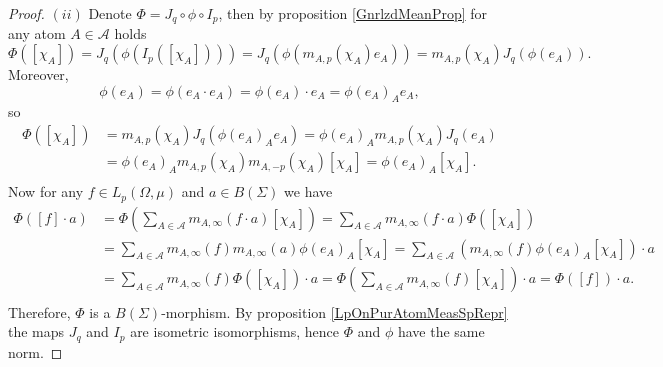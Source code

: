 \documentclass[12pt]{article}
\begin{document}
\begin{proof}
    $(ii)$ Denote $\Phi=J_q\circ \phi\circ I_p$, then by 
    proposition \ref{GnrlzdMeanProp} for any atom $A\in\mathcal{A}$ holds
    \[
        \Phi([\chi_A])
        =J_q(\phi(I_p([\chi_A])))
        =J_q(\phi(m_{A,p}(\chi_A)e_A))
        =m_{A,p}(\chi_A)J_q(\phi(e_A)).
    \]
    Moreover,
    \[
        \phi(e_A)
        =\phi(e_A\cdot e_A)
        =\phi(e_A)\cdot e_A
        =\phi(e_A)_A e_A,
    \]
    so
    \[
    \begin{aligned}
        \Phi([\chi_A])
        &=m_{A,p}(\chi_A)J_q(\phi(e_A)_A e_A) 
        =\phi(e_A)_A m_{A,p}(\chi_A)J_q( e_A) \\
        &=\phi(e_A)_A m_{A,p}(\chi_A)m_{A,-p}(\chi_A) [\chi_A] 
        =\phi(e_A)_A [\chi_A]. \\
    \end{aligned}
    \]
    Now for any $f\in L_p(\Omega, \mu)$ and $a\in B(\Sigma)$ we have
    \[
    \begin{aligned}
        \Phi([f]\cdot a)
        &=\Phi\left(
            \sum_{A\in\mathcal{A}} m_{A,\infty}(f\cdot a)[\chi_A]
        \right) 
        =\sum_{A\in\mathcal{A}} m_{A,\infty}(f\cdot a) \Phi([\chi_A]) \\
        &=\sum_{A\in\mathcal{A}} 
            m_{A,\infty}(f) m_{A,\infty}(a) \phi(e_A)_A [\chi_A] 
        =\sum_{A\in\mathcal{A}} 
            (m_{A,\infty}(f) \phi(e_A)_A [\chi_A])\cdot a \\
        &=\sum_{A\in\mathcal{A}} 
            m_{A,\infty}(f) \Phi([\chi_A])\cdot a 
        =\Phi\left(\sum_{A\in\mathcal{A}} 
            m_{A,\infty}(f) [\chi_A]\right)\cdot a 
        =\Phi([f])\cdot a. \\
    \end{aligned}
    \]
    Therefore, $\Phi$ is a $B(\Sigma)$-morphism. By 
    proposition \ref{LpOnPurAtomMeasSpRepr} the maps $J_q$ and $I_p$ are 
    isometric isomorphisms, hence $\Phi$ and $\phi$ have the same norm.
\end{proof}
\end{document}
